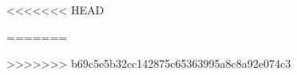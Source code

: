 \documentclass[oneside]{book}
\begin{document}
\maketitle



<<<<<<< HEAD

=======


>>>>>>> b69c5e5b32cc142875c65363995a8c8a92e074c3
\end{document}

